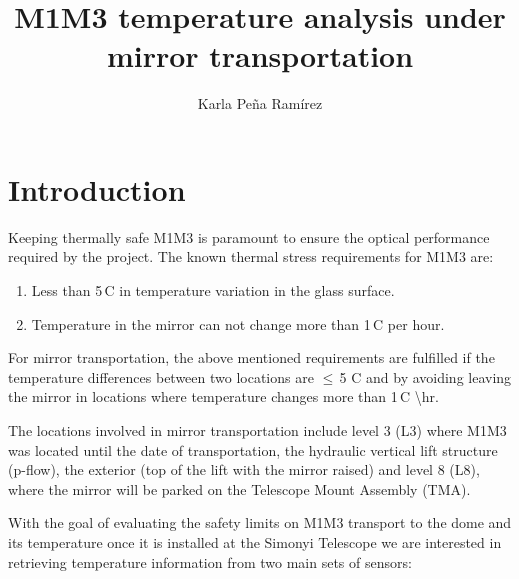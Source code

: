 \documentclass[SE,lsstdraft,authoryear,toc]{lsstdoc}
\title{M1M3 temperature analysis under mirror transportation}
\author{%
Karla Peña Ramírez
}
\date{\vcsDate}
\begin{document}
\mkshorttitle %


\section{Introduction}
Keeping thermally safe M1M3 is paramount to ensure the optical performance required by the project. The known thermal stress requirements for M1M3 are:
\begin{enumerate}
  \item Less than 5\,\textdegree C in temperature variation in the glass surface.
  \item Temperature in the mirror can not change more than 1\,\textdegree C per hour.
\end{enumerate}

For mirror transportation, the above mentioned requirements are fulfilled if the temperature differences between two locations are $\leq\,$5 \textdegree C and by avoiding leaving the mirror in locations where temperature changes more than 1\,\textdegree C \backslash hr.

The locations involved in mirror transportation include level 3 (L3) where M1M3 was located until the date of transportation, the hydraulic vertical lift structure (p-flow), the exterior (top of the lift with the mirror raised) and level 8 (L8), where the mirror will be parked on the Telescope Mount Assembly (TMA).

With the goal of evaluating the safety limits on M1M3 transport to the dome and its temperature once it is installed at the Simonyi Telescope we are interested in retrieving temperature information from two main sets of sensors:
\end{document}
